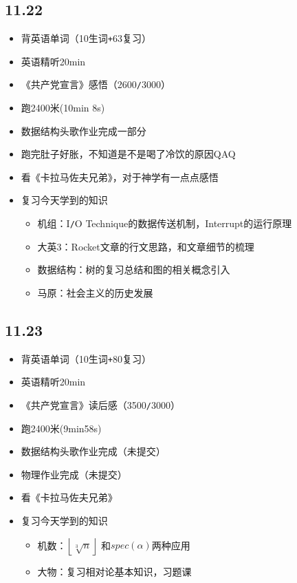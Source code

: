 \documentclass[UTF8]{ctexart}
\begin{document}
\subsection*{11.22}
\begin{itemize}
    \item 背英语单词（10生词\verb|+|63复习）
    \item 英语精听20min
    \item 《共产党宣言》感悟（2600\verb|/|3000）
    \item 跑2400米(10min 8s)
    \item 数据结构头歌作业完成一部分
    \item 跑完肚子好胀，不知道是不是喝了冷饮的原因QAQ
    \item 看《卡拉马佐夫兄弟》，对于神学有一点点感悟
    \item 复习今天学到的知识
          \begin{itemize}
              \item 机组：I\verb|/|O Technique的数据传送机制，Interrupt的运行原理
              \item 大英3：Rocket文章的行文思路，和文章细节的梳理
              \item 数据结构：树的复习总结和图的相关概念引入
              \item 马原：社会主义的历史发展
          \end{itemize}
\end{itemize}
\subsection*{11.23}
\begin{itemize}
    \item 背英语单词（10生词\verb|+|80复习）
    \item 英语精听20min
    \item 《共产党宣言》读后感（3500\verb|/|3000）
    \item 跑2400米(9min58s)
    \item 数据结构头歌作业完成（未提交）
    \item 物理作业完成（未提交）
    \item 看《卡拉马佐夫兄弟》
    \item 复习今天学到的知识
          \begin{itemize}
              \item 机数：$\left \lfloor \sqrt[3]{n}  \right \rfloor $ 和$spec(\alpha)$两种应用
              \item 大物：复习相对论基本知识，习题课
          \end{itemize}
\end{itemize}
\end{document}
